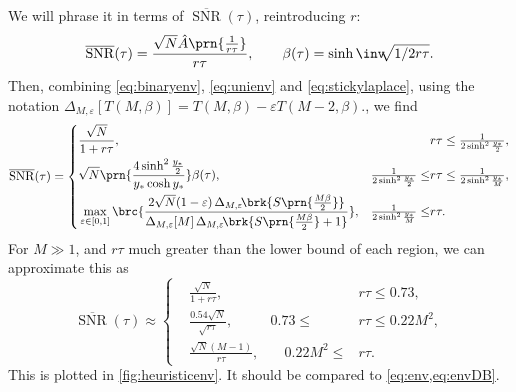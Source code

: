 \documentclass[12pt]{article}
\DeclareMathOperator{\snr}{SNR}
\newcommand{\snrb}{\overline{\snr}}
\begin{document}
We will phrase it in terms of \(\snrb(\tau)\), reintroducing \(r\):
%
\begin{equation}\label{eq:envunits}
  \snrb(\tau) = \frac{ \sqrt{N} \hat{A}\prn{\frac{1}{r\tau}} }{ r\tau },
  \qquad
  \beta(\tau) = \sinh\inv \!\!\sqrt{1/2r\tau}.
\end{equation}
%
Then, combining \eqref{eq:binaryenv}, \eqref{eq:unienv} and \eqref{eq:stickylaplace}, using the notation \( \Delta_{M,\varepsilon}[T(M, \beta)] = T(M, \beta) - \varepsilon T(M-2, \beta) \)., we find
%
\begin{equation}\label{eq:henv}
  \snrb(\tau) = \left\{
\begin{aligned}
  & \frac{\sqrt{N}}{1+r\tau}, &
  & r\tau \leq \tfrac{1}{2\sinh^2\frac{y_*}{2}} , \\
  & \sqrt{N}\prn{ \frac{ 4\sinh^2 \frac{y_*}{2} }{ y_* \cosh y_* } } \beta(\tau), &
  \tfrac{1}{2\sinh^2 \frac{y_*}{2}} \leq & r\tau \leq \tfrac{1}{2\sinh^2 \frac{y_*}{M}} , \\
  & \max_{\varepsilon \in [0,1]} \brc{
      \frac{2\sqrt{N}(1-\varepsilon)\, \Delta_{M,\varepsilon}\! \brk{S\prn{\tfrac{M\beta}{2}}}}
      {\Delta_{M,\varepsilon}[M]\, \Delta_{M,\varepsilon}\! \brk{S\prn{\tfrac{M\beta}{2}} + 1} } }, &
  \tfrac{1}{2\sinh^2 \frac{y_*}{M}} \leq & r\tau .
\end{aligned}
\right.
\end{equation}
%
For \(M \gg 1\), and \(r\tau\) much greater than the lower bound of each region, we can approximate this as
%
\begin{equation}\label{eq:henvapprox}
  \snrb(\tau) \approx \left\{
\begin{aligned}
  & \frac{\sqrt{N}}{1+r\tau}, &
  & r\tau \leq 0.73 , \\
  & \frac{ 0.54\sqrt{N}}{ \sqrt{r\tau} } , &
  0.73 \leq & r\tau \leq 0.22 M^2 , \\
  & \frac{ \sqrt{N} (M-1) }{ r\tau }, &\quad
  0.22 M^2 \leq &r\tau .
\end{aligned}
\right.
\end{equation}
%
This is plotted in \cref{fig:heuristicenv}.
It should be compared to \cref{eq:env,eq:envDB}.
\end{document}
